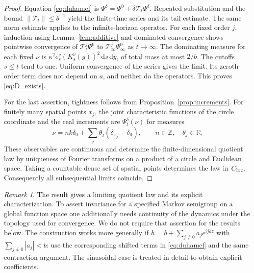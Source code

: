 \documentclass[11pt]{article}
\numberwithin{equation}{section}
\theoremstyle{definition}
\theoremstyle{remark}
\newtheorem{remark}[theorem]{Remark}
\newcommand{\R}{\mathbb R}
\newcommand{\dd}{\,\mathrm d}
\begin{document}
\begin{proof}
Equation \eqref{eq:duhamel} is $\Psi^\delta=\Psi^0+\delta\mathcal T_t\Psi^\delta$. Repeated substitution and the bound $\|\mathcal T_t\|\le b^{-1}$ yield the finite-time series and its tail estimate. The same norm estimate applies to the infinite-horizon operator. For each fixed order $j$, induction using Lemma~\ref{lem:additive} and dominated convergence shows pointwise convergence of $\mathcal T_t^j\Psi^0$ to $\mathcal T_\infty^j\Psi_\infty^0$ as $t\to\infty$. The dominating measure for each fixed $\nu$ is $\kappa^2 e_s^\nu(K_s^\nu(y))^2\dd s\dd y$, of total mass at most $2/b$. The cutoffs $s\le t$ tend to one. Uniform convergence of the series gives the limit. Its zeroth-order term does not depend on $a$, and neither do the operators. This proves \eqref{eq:D_exists}.

For the last assertion, tightness follows from Proposition~\ref{prop:increments}. For finitely many spatial points $x_j$, the joint characteristic functions of the circle coordinate and the real increments are $\Psi_t^\delta(\nu)$ for measures
\[
 \nu=n k\delta_0+\sum_j \theta_j(\delta_{x_j}-\delta_0),\qquad n\in\mathbb Z,\quad \theta_j\in\R.
\]
These observables are continuous and determine the finite-dimensional quotient law by uniqueness of Fourier transforms on a product of a circle and Euclidean space. Taking a countable dense set of spatial points determines the law in $C_{\rm loc}$. Consequently all subsequential limits coincide.
\end{proof}
\begin{remark}
The result gives a limiting quotient law and its explicit characterization. To assert invariance for a specified Markov semigroup on a global function space one additionally needs continuity of the dynamics under the topology used for convergence. We do not require that assertion for the results below. The construction works more generally if $h=b+\sum_{j\ne0}a_j e^{ijkz}$ with $\sum_{j\ne0}|a_j|<b$: use the corresponding shifted terms in \eqref{eq:duhamel} and the same contraction argument. The sinusoidal case is treated in detail to obtain explicit coefficients.
\end{remark}
\end{document}
